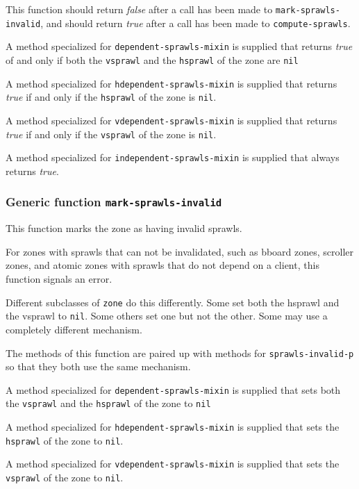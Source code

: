 \documentclass{report}
\begin{document}
This function should return \emph{false} after a call has been made to
\texttt{mark-sprawls-invalid}, and should return \emph{true} after a
call has been made to \texttt{compute-sprawls}.  

A method specialized for \texttt{dependent-sprawls-mixin} is supplied
that returns \emph{true} of and only if both the \texttt{vsprawl} and
the \texttt{hsprawl} of the zone are \texttt{nil}

A method specialized for \texttt{hdependent-sprawls-mixin} is supplied
that returns \emph{true} if and only if the \texttt{hsprawl} of the zone
is \texttt{nil}.

A method specialized for \texttt{vdependent-sprawls-mixin} is supplied
that returns \emph{true} if and only if the \texttt{vsprawl} of the zone
is \texttt{nil}.

A method specialized for \texttt{independent-sprawls-mixin} is supplied
that always returns \emph{true}. 

\subsubsection{Generic function \texttt{mark-sprawls-invalid}}
\label{generic-function-mark-sprawls-invalid}

This function marks the zone as having invalid sprawls.  

For zones with sprawls that can not be invalidated, such as bboard
zones, scroller zones, and atomic zones with sprawls that do not depend
on a client, this function signals an error.

Different subclasses of \texttt{zone} do this differently.  Some set
both the hsprawl and the vsprawl to \texttt{nil}.  Some others set one but
not the other.  Some may use a completely different mechanism.

The methods of this function are paired up with methods for
\texttt{sprawls-invalid-p} so that they both use the same mechanism.

A method specialized for \texttt{dependent-sprawls-mixin} is supplied
that sets both the \texttt{vsprawl} and the \texttt{hsprawl} of the zone
to \texttt{nil}

A method specialized for \texttt{hdependent-sprawls-mixin} is supplied
that sets the \texttt{hsprawl} of the zone to \texttt{nil}.

A method specialized for \texttt{vdependent-sprawls-mixin} is supplied
that sets the \texttt{vsprawl} of the zone to \texttt{nil}.
\end{document}
